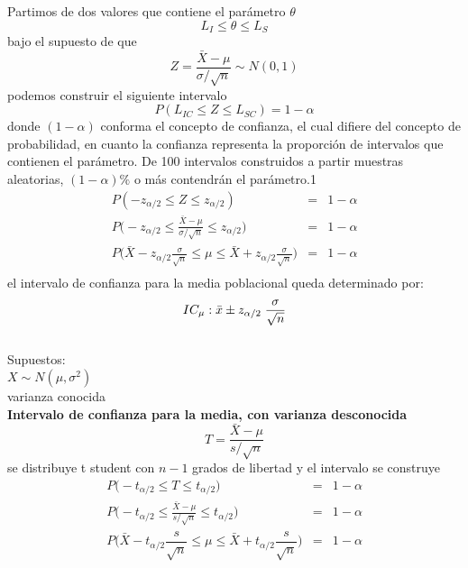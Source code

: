 \documentclass[base=hide,12pt]{elegantbook}
\begin{document}
Partimos de dos valores que contiene el parámetro $\theta$
	$$L_{I} \leq \theta \leq L_{S} $$
	bajo el supuesto de que
	$$Z=\frac{\bar{X}-\mu}{\sigma/\sqrt{n}} \sim N(0,1)$$
	podemos construir el siguiente intervalo
	$$P(L_{IC} \leq Z \leq L_{SC})=1-\alpha $$
	donde $(1-\alpha)$ conforma el concepto de confianza, el cual difiere del concepto de probabilidad, en cuanto la confianza representa la proporción de intervalos que contienen el parámetro. 
	De 100 intervalos construidos a partir muestras aleatorias, $(1-\alpha)\%$ o más contendrán el parámetro.1 \\
	\begin{eqnarray*}
		P(-z_{\alpha/2} \leq Z \leq z_{\alpha/2})&=&1-\alpha \\
		P\Bigg(-z_{\alpha/2} \leq \frac{\bar{X}-\mu}{\sigma/\sqrt{n}} \leq z_{\alpha/2}\Bigg)&=&1-\alpha\\
		P\Bigg(\bar{X}-z_{\alpha/2}\frac{\sigma}{\sqrt{n}} \leq \mu \leq \bar{X}+z_{\alpha/2}\frac{\sigma}{\sqrt{n}}\Bigg)&=&1-\alpha \\
	\end{eqnarray*}
	el intervalo de confianza para la media poblacional queda determinado por:\\

			$$IC_{\mu}: \bar{x} \pm z_{\alpha/2} \hspace{.1cm}\dfrac{\sigma}{\sqrt{n}} $$
			\\
			Supuestos:\\
			$X\sim N(\mu,\sigma^{2})$\\
			varianza conocida\\
			

	
\textcolor{col4}{\bf \large Intervalo de confianza para la media, con varianza desconocida }\\
	
	$$T=\dfrac{\bar{X}-\mu}{s/ \sqrt{n}}$$
	se distribuye t student con $n-1$ grados de libertad y el intervalo se construye \\
	\begin{eqnarray*}
		P\Big(-t_{\alpha/2} \leq T \leq t_{\alpha/2} \Big)&=&1-\alpha \\
		P\Big(-t_{\alpha/2} \leq \frac{\bar{X}-\mu}{s/\sqrt{n}} \leq t_{\alpha/2} \Big)&=&1-\alpha \\
		P\Bigg(\bar{X}-t_{\alpha/2} \dfrac{s}{\sqrt{n}} \leq \mu \leq \bar{X}+t_{\alpha/2}\dfrac{s}{\sqrt{n}}\Bigg)&=&1-\alpha \\
	\end{eqnarray*}
\end{document}

